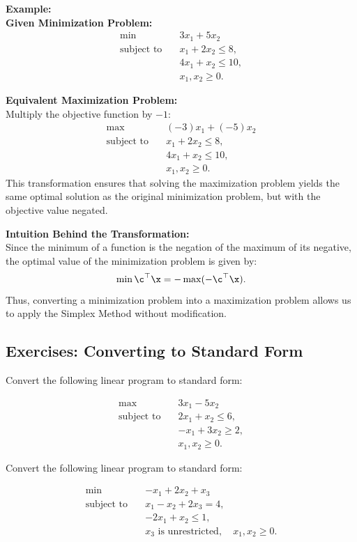 \textbf{Example:} \\

\textbf{Given Minimization Problem:}
\[
\begin{aligned}
    \min \quad & 3x_1 + 5x_2 \\
    \text{subject to} \quad 
    & x_1 + 2x_2 \leq 8, \\
    & 4x_1 + x_2 \leq 10, \\
    & x_1, x_2 \geq 0.
\end{aligned}
\]

\textbf{Equivalent Maximization Problem:} \\
Multiply the objective function by \(-1\):
\[
\begin{aligned}
    \max \quad & (-3)x_1 + (-5)x_2 \\
    \text{subject to} \quad 
    & x_1 + 2x_2 \leq 8, \\
    & 4x_1 + x_2 \leq 10, \\
    & x_1, x_2 \geq 0.
\end{aligned}
\]
This transformation ensures that solving the maximization problem yields the same optimal solution as the original minimization problem, but with the objective value negated.

\textbf{Intuition Behind the Transformation:} \\
Since the minimum of a function is the negation of the maximum of its negative, the optimal value of the minimization problem is given by:
\[
\min \c^\top \x = - \max (-\c^\top \x).
\]
Thus, converting a minimization problem into a maximization problem allows us to apply the Simplex Method without modification.


\subsection{Exercises: Converting to Standard Form}

\begin{ex}{}{}
Convert the following linear program to standard form:

\[
\begin{aligned}
    \max \quad & 3x_1 - 5x_2 \\
    \text{subject to} \quad 
    & 2x_1 + x_2 \leq 6, \\
    & -x_1 + 3x_2 \geq 2, \\
    & x_1, x_2 \geq 0.
\end{aligned}
\]
\end{ex}

\begin{ex}{}{}
Convert the following linear program to standard form:

\[
\begin{aligned}
    \min \quad & -x_1 + 2x_2 + x_3 \\
    \text{subject to} \quad 
    & x_1 - x_2 + 2x_3 = 4, \\
    & -2x_1 + x_2 \leq 1, \\
    & x_3 \text{ is unrestricted}, \quad x_1, x_2 \geq 0.
\end{aligned}
\]
\end{ex}

